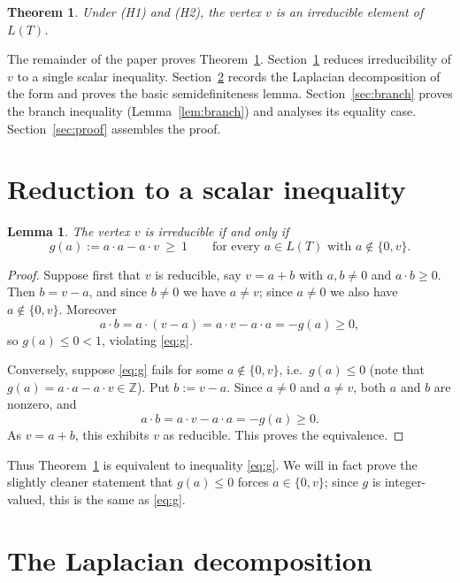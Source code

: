 \documentclass[11pt]{article}
\newcommand{\bZ}{\mathbb{Z}}
\newtheorem{theorem}{Theorem}
\newtheorem{lemma}{Lemma}
\theoremstyle{definition}
\begin{document}
\begin{theorem}\label{thm:main}
Under \textup{(H1)} and \textup{(H2)}, the vertex $v$ is an irreducible element of $L(T)$.
\end{theorem}

The remainder of the paper proves Theorem~\ref{thm:main}. Section~\ref{sec:reduce}
reduces irreducibility of $v$ to a single scalar inequality. Section~\ref{sec:lap}
records the Laplacian decomposition of the form and proves the basic semidefiniteness
lemma. Section~\ref{sec:branch} proves the branch inequality (Lemma~\ref{lem:branch})
and analyses its equality case. Section~\ref{sec:proof} assembles the proof.

\section{Reduction to a scalar inequality}\label{sec:reduce}

\begin{lemma}\label{lem:reduce}
The vertex $v$ is irreducible if and only if
\begin{equation}\label{eq:g}
g(a):=a\cdot a-a\cdot v\ \ge\ 1\qquad\text{for every }a\in L(T)\text{ with }a\notin\{0,v\}.
\end{equation}
\end{lemma}

\begin{proof}
Suppose first that $v$ is reducible, say $v=a+b$ with $a,b\neq 0$ and $a\cdot b\ge 0$.
Then $b=v-a$, and since $b\neq 0$ we have $a\neq v$; since $a\neq 0$ we also have
$a\notin\{0,v\}$. Moreover
\[
a\cdot b=a\cdot(v-a)=a\cdot v-a\cdot a=-g(a)\ge 0,
\]
so $g(a)\le 0<1$, violating \eqref{eq:g}.

Conversely, suppose \eqref{eq:g} fails for some $a\notin\{0,v\}$, i.e.\ $g(a)\le 0$
(note that $g(a)=a\cdot a-a\cdot v\in\bZ$). Put $b:=v-a$. Since $a\neq 0$ and $a\neq v$,
both $a$ and $b$ are nonzero, and
\[
a\cdot b=a\cdot v-a\cdot a=-g(a)\ge 0 .
\]
As $v=a+b$, this exhibits $v$ as reducible. This proves the equivalence.
\end{proof}

Thus Theorem~\ref{thm:main} is equivalent to inequality \eqref{eq:g}. We will in fact
prove the slightly cleaner statement that $g(a)\le 0$ forces $a\in\{0,v\}$; since
$g$ is integer-valued, this is the same as \eqref{eq:g}.

\section{The Laplacian decomposition}\label{sec:lap}
\end{document}
